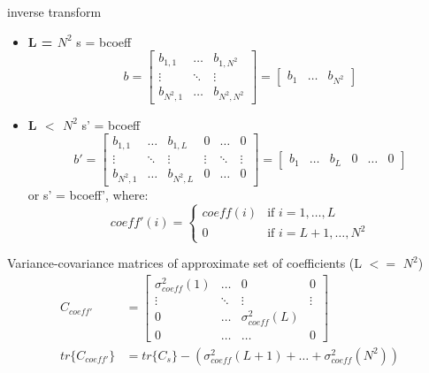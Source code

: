 \documentclass{article}
\begin{document}
inverse transform
\begin{itemize}
    \item \textbf{L = $N^2$} s = bcoeff\\
    \begin{equation}
        b = \begin{bmatrix}
            b_{1, 1} & \dots & b_{1, N^2} \\
            \vdots & \ddots & \vdots \\
            b_{N^2, 1} & \dots & b_{N^2, N^2}
        \end{bmatrix} = \begin{bmatrix}
            b_1 & \dots & b_{N^2}
        \end{bmatrix}
    \end{equation}
    \item \textbf{L $<$ $N^2$} s' = bcoeff\\
    \begin{equation}
        b' = \begin{bmatrix}
            b_{1, 1} & \dots & b_{1, L} & 0 & \dots & 0 \\
            \vdots & \ddots & \vdots & \vdots & \ddots & \vdots \\
            b_{N^2, 1} & \dots & b_{N^2, L} & 0 & \dots & 0
        \end{bmatrix} = \begin{bmatrix}
            b_1 & \dots & b_L & 0 & \dots & 0
        \end{bmatrix}
    \end{equation}
    or s' = bcoeff', where:
    \begin{equation}
        coeff'(i) = \begin{cases}
            coeff(i) & \text{if } i = 1,\dots, L \\
            0 & \text{if } i = L+1,\dots, N^2
        \end{cases}
    \end{equation}
\end{itemize}
Variance-covariance matrices of approximate set of coefficients (L $<=$ $N^2$)\\

\begin{equation}
    \begin{split}
        C_{coeff'} &= \begin{bmatrix}
            \sigma_{coeff}^2(1) & \dots & 0 & 0 \\
            \vdots & \ddots & \vdots & \vdots \\
            0 & \dots & \sigma_{coeff}^2(L) \\
            0 & \dots & \dots & 0
        \end{bmatrix} \\
        tr\{C_{coeff'}\} &= tr\{C_s\} - (\sigma_{coeff}^2(L+1) + \dots + \sigma_{coeff}^2(N^2)) \\
    \end{split}
\end{equation}
\end{document}
